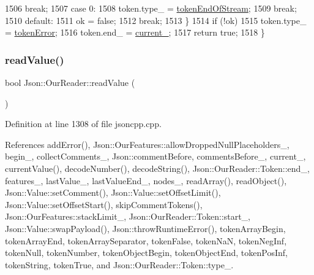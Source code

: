\begin{DoxyCode}
1506     \textcolor{keywordflow}{break};
1507   \textcolor{keywordflow}{case} 0:
1508     token.type\_ = \hyperlink{class_json_1_1_our_reader_a15116f7276ddf1e7a2cc3cbefa884dcca735d1f76eafc2c0c581ed79c077aaa7e}{tokenEndOfStream};
1509     \textcolor{keywordflow}{break};
1510   \textcolor{keywordflow}{default}:
1511     ok = \textcolor{keyword}{false};
1512     \textcolor{keywordflow}{break};
1513   \}
1514   \textcolor{keywordflow}{if} (!ok)
1515     token.type\_ = \hyperlink{class_json_1_1_our_reader_a15116f7276ddf1e7a2cc3cbefa884dccad39f929b971de8dc55fe84a2d2e3465e}{tokenError};
1516   token.end\_ = \hyperlink{class_json_1_1_our_reader_a5211fbbba94be80a22dd2317c621efcc}{current\_};
1517   \textcolor{keywordflow}{return} \textcolor{keyword}{true};
1518 \}
\end{DoxyCode}
\mbox{\label{class_json_1_1_our_reader_a1765d9670d191c89a57a22ea5591d35f}} 
\subsubsection{\texorpdfstring{read\+Value()}{readValue()}}
{\footnotesize\ttfamily bool Json\+::\+Our\+Reader\+::read\+Value (\begin{DoxyParamCaption}{ }\end{DoxyParamCaption})\hspace{0.3cm}{\ttfamily [private]}}



Definition at line 1308 of file jsoncpp.\+cpp.



References add\+Error(), Json\+::\+Our\+Features\+::allow\+Dropped\+Null\+Placeholders\+\_\+, begin\+\_\+, collect\+Comments\+\_\+, Json\+::comment\+Before, comments\+Before\+\_\+, current\+\_\+, current\+Value(), decode\+Number(), decode\+String(), Json\+::\+Our\+Reader\+::\+Token\+::end\+\_\+, features\+\_\+, last\+Value\+\_\+, last\+Value\+End\+\_\+, nodes\+\_\+, read\+Array(), read\+Object(), Json\+::\+Value\+::set\+Comment(), Json\+::\+Value\+::set\+Offset\+Limit(), Json\+::\+Value\+::set\+Offset\+Start(), skip\+Comment\+Tokens(), Json\+::\+Our\+Features\+::stack\+Limit\+\_\+, Json\+::\+Our\+Reader\+::\+Token\+::start\+\_\+, Json\+::\+Value\+::swap\+Payload(), Json\+::throw\+Runtime\+Error(), token\+Array\+Begin, token\+Array\+End, token\+Array\+Separator, token\+False, token\+NaN, token\+Neg\+Inf, token\+Null, token\+Number, token\+Object\+Begin, token\+Object\+End, token\+Pos\+Inf, token\+String, token\+True, and Json\+::\+Our\+Reader\+::\+Token\+::type\+\_\+.



